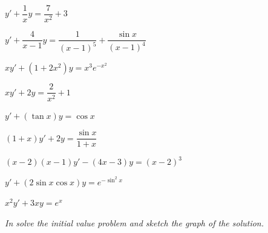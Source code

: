 \begin{exerciselistTwoColumn}
\item\label{exer:2.1.16}$y'+\dfrac{1}{x}y=\dfrac{7}{x^2}+3$
\item\label{exer:2.1.17}$y'+\dfrac{4}{x-1}y
= \dfrac{1}{(x-1)^5}+\dfrac{\sin x}{(x-1)^4}$
\item\label{exer:2.1.18}$xy'+(1+2x^2)y=x^3e^{-x^2}$
\item\label{exer:2.1.19}$xy'+2y=\dfrac{2}{x^2}+1$
\item\label{exer:2.1.20}$y'+(\tan x)y=\cos x$
\item\label{exer:2.1.21}$(1+x)y'+2y=\dfrac{\sin x}{ 1 + x}$
\item\label{exer:2.1.22}$(x-2)(x-1)y'-(4x-3)y=(x-2)^3$
\item\label{exer:2.1.23}$y'+(2\sin x\cos x) y=e^{-\sin^2x}$
\item\label{exer:2.1.24}$x^2y'+3xy=e^x$
\end{exerciselistTwoColumn}
%
\textsl{In  solve the
initial value problem and sketch the graph of the solution.}

